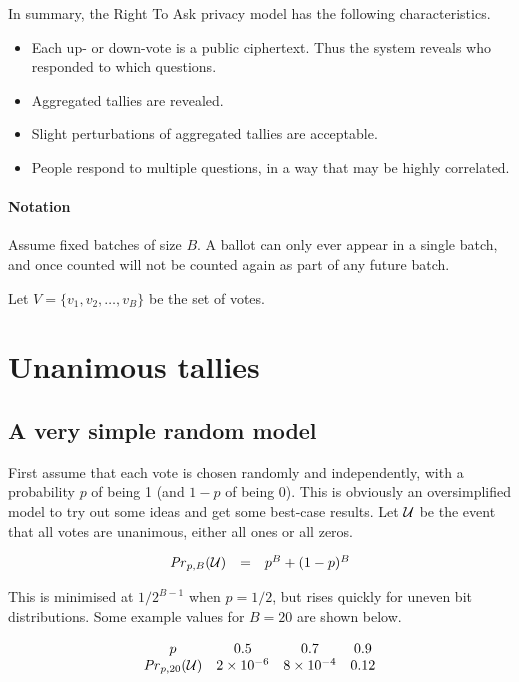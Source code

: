 \documentclass[10pt,a4paper]{article}
\begin{document}
In summary, the Right To Ask privacy model has the following characteristics. 
\begin{itemize}
	\item Each up- or down-vote is a public ciphertext. Thus the system reveals who responded to which questions.
	\item Aggregated tallies are revealed.
	\item Slight perturbations of aggregated tallies are acceptable.
	\item People respond to multiple questions, in a way that may be highly correlated.
\end{itemize}


\paragraph{Notation} Assume fixed batches of size $B$. A ballot can only ever appear in a single batch, and once counted will not be counted again as part of any future batch. 

Let $V = \{ v_1, v_2,\ldots,v_B\}$ be the set of votes.

\section{Unanimous tallies}

\subsection{A very simple random model}
First assume that each vote is chosen randomly and independently, with a probability $p$ of being 1 (and $1-p$ of being 0). This is obviously an oversimplified model to try out some ideas and get some best-case results.
Let $\mathcal{U}$ be the event that all votes are unanimous, either all ones or all zeros.

$$
\begin{array}{rcl}
	\mathit{Pr}_{p,B}(\mathcal{U}) & = & p^{B} + (1-p)^B \\
\end{array}
$$

This is minimised at $1/2^{B-1}$ when $p=1/2$, but rises quickly for uneven bit distributions. Some example values for $B=20$ are shown below.

$$
\begin{array}{cccc}
p & 0.5 & 0.7 & 0.9 \\
\mathit{Pr}_{p,20}(\mathcal{U}) & 2 \times 10^{-6} & 8 \times 10^{-4} & 0.12
\end{array}
$$
\end{document}
